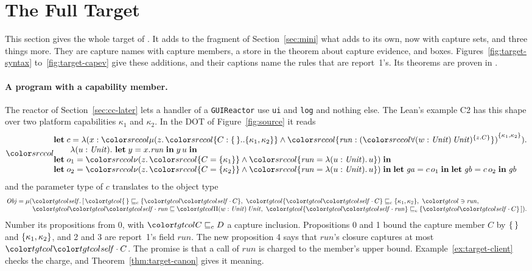 \section{The Full \treeK Target}\label{sec:target}
\mathtgt

This section gives the whole target of \treeK. It adds to the fragment of Section~\ref{sec:mini} what \Rone adds to its own, now with capture sets, and three things more. They are capture names with capture members, a store in the theorem about capture evidence, and boxes. Figures~\ref{fig:target-syntax} to~\ref{fig:target-capev} give these additions, and their captions name the rules that are report~1's. Its theorems are proven in \treeK.

\paragraph{A program with a capability member.}
The reactor of Section~\ref{sec:cc-later} lets a handler of a \lstinline{GUIReactor} use \lstinline{ui} and \lstinline{log} and nothing else. The Lean's example C2 has this shape over two platform capabilities $\kappa_1$ and $\kappa_2$. In the DOT of Figure~\ref{fig:source} it reads
\[
\src{\begin{array}{@{}l@{}}
\klet c = \lambda(x : \capt{\dmu{z}{\dcap{C}{\cempty}{\cset{\kappa_1, \kappa_2}} \wedge \dfld{\mathit{run}}{\capt{(\dall{w}{\Unit}{\Unit})}{\cset{z.C}}}}}{\cset{\kappa_1, \kappa_2}}). \\
\qquad \lambda(u : \Unit).\ \klet y = x.\mathit{run} \kin y\,u \kin \\
\klet o_1 = \dnew{z}{\ddeftyp{C}{\cset{\kappa_1}} \wedge \ddeftrm{\mathit{run}}{\lambda(u : \Unit).\,u}} \kin \\
\klet o_2 = \dnew{z}{\ddeftyp{C}{\cset{\kappa_2}} \wedge \ddeftrm{\mathit{run}}{\lambda(u : \Unit).\,u}} \kin
\klet \mathit{ga} = c\,o_1 \kin \klet \mathit{gb} = c\,o_2 \kin \mathit{gb}
\end{array}}
\]
and the parameter type of $c$ translates to the object type
\[
\begin{array}{@{}l@{}}
\mathit{Obj} = \mu(\self.\,[\,\plec{\cempty}{\cset{\sel{\self}{C}}},\ \plec{\cset{\sel{\self}{C}}}{\cset{\kappa_1,\kappa_2}},\ \phas{\mathit{run}}, \\
\qquad\qquad \ple{\sel{\self}{\mathit{run}}}{\pit[w]{\Unit}{\Unit}},\ \plec{\cset{\sel{\self}{\mathit{run}}}}{\cset{\sel{\self}{C}}}\,]) .
\end{array}
\]
Number its propositions from 0, with $\plec{C}{D}$ a capture inclusion. Propositions 0 and 1 bound the capture member $C$ by $\{\,\}$ and $\{\kappa_1,\kappa_2\}$, and 2 and 3 are report~1's field $\mathit{run}$. The new proposition 4 says that $\mathit{run}$'s closure captures at most $\sel{\self}{C}$. The promise is that a call of $\mathit{run}$ is charged to the member's upper bound. Example~\ref{ex:target-client} checks the charge, and Theorem~\ref{thm:target-canon} gives it meaning.

